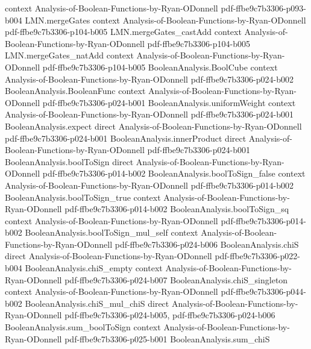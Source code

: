 \begin{lemma}
  {context}
  {Analysis-of-Boolean-Functions-by-Ryan-ODonnell}
  {pdf-ffbe9c7b3306-p093-b004}
\proofstep
  {LMN.mergeGates}
  {context}
  {Analysis-of-Boolean-Functions-by-Ryan-ODonnell}
  {pdf-ffbe9c7b3306-p104-b005}
\proofstep
  {LMN.mergeGates_castAdd}
  {context}
  {Analysis-of-Boolean-Functions-by-Ryan-ODonnell}
  {pdf-ffbe9c7b3306-p104-b005}
\proofstep
  {LMN.mergeGates_natAdd}
  {context}
  {Analysis-of-Boolean-Functions-by-Ryan-ODonnell}
  {pdf-ffbe9c7b3306-p104-b005}
\proofstep
  {BooleanAnalysis.BoolCube}
  {context}
  {Analysis-of-Boolean-Functions-by-Ryan-ODonnell}
  {pdf-ffbe9c7b3306-p024-b002}
\proofstep
  {BooleanAnalysis.BooleanFunc}
  {context}
  {Analysis-of-Boolean-Functions-by-Ryan-ODonnell}
  {pdf-ffbe9c7b3306-p024-b001}
\proofstep
  {BooleanAnalysis.uniformWeight}
  {context}
  {Analysis-of-Boolean-Functions-by-Ryan-ODonnell}
  {pdf-ffbe9c7b3306-p024-b001}
\proofstep
  {BooleanAnalysis.expect}
  {direct}
  {Analysis-of-Boolean-Functions-by-Ryan-ODonnell}
  {pdf-ffbe9c7b3306-p024-b001}
\proofstep
  {BooleanAnalysis.innerProduct}
  {direct}
  {Analysis-of-Boolean-Functions-by-Ryan-ODonnell}
  {pdf-ffbe9c7b3306-p024-b001}
\proofstep
  {BooleanAnalysis.boolToSign}
  {direct}
  {Analysis-of-Boolean-Functions-by-Ryan-ODonnell}
  {pdf-ffbe9c7b3306-p014-b002}
\proofstep
  {BooleanAnalysis.boolToSign_false}
  {context}
  {Analysis-of-Boolean-Functions-by-Ryan-ODonnell}
  {pdf-ffbe9c7b3306-p014-b002}
\proofstep
  {BooleanAnalysis.boolToSign_true}
  {context}
  {Analysis-of-Boolean-Functions-by-Ryan-ODonnell}
  {pdf-ffbe9c7b3306-p014-b002}
\proofstep
  {BooleanAnalysis.boolToSign_sq}
  {context}
  {Analysis-of-Boolean-Functions-by-Ryan-ODonnell}
  {pdf-ffbe9c7b3306-p014-b002}
\proofstep
  {BooleanAnalysis.boolToSign_mul_self}
  {context}
  {Analysis-of-Boolean-Functions-by-Ryan-ODonnell}
  {pdf-ffbe9c7b3306-p024-b006}
\proofstep
  {BooleanAnalysis.chiS}
  {direct}
  {Analysis-of-Boolean-Functions-by-Ryan-ODonnell}
  {pdf-ffbe9c7b3306-p022-b004}
\proofstep
  {BooleanAnalysis.chiS_empty}
  {context}
  {Analysis-of-Boolean-Functions-by-Ryan-ODonnell}
  {pdf-ffbe9c7b3306-p024-b007}
\proofstep
  {BooleanAnalysis.chiS_singleton}
  {context}
  {Analysis-of-Boolean-Functions-by-Ryan-ODonnell}
  {pdf-ffbe9c7b3306-p044-b002}
\proofstep
  {BooleanAnalysis.chiS_mul_chiS}
  {direct}
  {Analysis-of-Boolean-Functions-by-Ryan-ODonnell}
  {pdf-ffbe9c7b3306-p024-b005,
    pdf-ffbe9c7b3306-p024-b006}
\proofstep
  {BooleanAnalysis.sum_boolToSign}
  {context}
  {Analysis-of-Boolean-Functions-by-Ryan-ODonnell}
  {pdf-ffbe9c7b3306-p025-b001}
\proofstep
  {BooleanAnalysis.sum_chiS}

\end{lemma}
